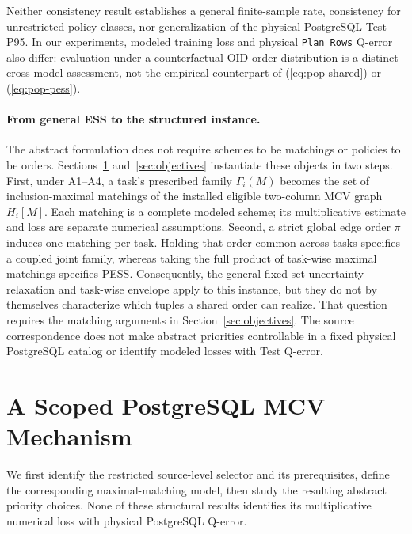 \documentclass[sigconf, nonacm]{acmart}
\begin{document}
Neither consistency result establishes a general finite-sample
rate, consistency for unrestricted policy classes, nor
generalization of the physical PostgreSQL Test P95.
In our experiments, modeled training loss and physical
\texttt{Plan Rows} Q-error also differ: evaluation under
a counterfactual OID-order distribution is a distinct
cross-model assessment, not the empirical counterpart of
(\ref{eq:pop-shared}) or (\ref{eq:pop-pess}).

\paragraph{From general ESS to the structured instance.}
The abstract formulation does not require schemes to be
matchings or policies to be orders. Sections~\ref{sec:pg}
and~\ref{sec:objectives} instantiate these objects in two
steps. First, under A1--A4, a task's prescribed family
$\Gamma_i(M)$ becomes the set of inclusion-maximal
matchings of the installed eligible two-column MCV
graph $H_i[M]$. Each matching is a complete modeled
scheme; its multiplicative estimate and loss are
separate numerical assumptions. Second, a strict
global edge order $\pi$ induces one matching per task.
Holding that order common across tasks specifies a
coupled joint family, whereas taking the full product
of task-wise maximal matchings specifies PESS.
Consequently, the general fixed-set uncertainty
relaxation and task-wise envelope apply to this
instance, but they do not by themselves characterize
which tuples a shared order can realize. That question
requires the matching arguments in
Section~\ref{sec:objectives}. The source correspondence
does not make abstract priorities controllable in a
fixed physical PostgreSQL catalog or identify modeled
losses with Test Q-error.

\section{A Scoped PostgreSQL MCV Mechanism}
\label{sec:pg}
We first identify the restricted source-level selector and its
prerequisites, define the corresponding maximal-matching model,
then study the resulting abstract priority choices. None of these structural results identifies its
multiplicative numerical loss with physical PostgreSQL Q-error.
\end{document}
